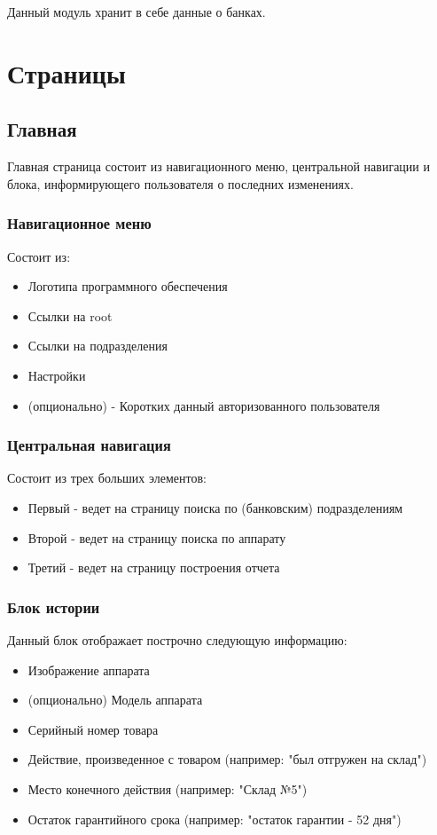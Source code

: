 \documentclass[DIV=calc, paper=a4, fontsize=11pt]{scrartcl} %
\begin{document}
Данный модуль хранит в себе данные о банках.


\section{Страницы}

\subsection{Главная}

Главная страница состоит из навигационного меню, центральной навигации и блока, информирующего пользователя о последних изменениях.

\subsubsection{Навигационное меню}

Состоит из:
\begin{itemize}
	\item Логотипа программного обеспечения
	\item Ссылки на root
	\item Ссылки на подразделения
	\item Настройки
	\item (опционально) - Коротких данный авторизованного пользователя
\end{itemize}

\subsubsection{Центральная навигация}
Состоит из трех больших элементов:
\begin{itemize}
	\item Первый - ведет на страницу поиска по (банковским) подразделениям
	\item Второй - ведет на страницу поиска по аппарату
	\item Третий - ведет на страницу построения отчета
\end{itemize}

\subsubsection{Блок истории}
Данный блок отображает построчно следующую информацию:
\begin{itemize}
	\item Изображение аппарата
	\item (опционально) Модель аппарата
	\item Серийный номер товара
	\item Действие, произведенное с товаром (например: "был отгружен на склад")
	\item Место конечного действия (например: "Склад №5")
	\item Остаток гарантийного срока (например: "остаток гарантии - 52 дня")
\end{itemize}
\end{document}
